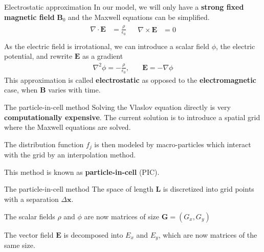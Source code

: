 \documentclass{beamer}
\newcommand*\V[1]{\bm{#1}}
\newcommand{\E}{\V{E}}
\newcommand{\B}{\V{B}}
\newcommand{\x}{\V{x}}
\begin{document}
\begin{frame}{Electrostatic approximation}{}
In our model, we will only have a \textbf{strong fixed magnetic field} $\B_0$ 
and the Maxwell equations can be simplified.
\small
\begin{align}
\begin{split}
\nabla \cdot \E &= \frac {\rho }{\epsilon_0} \\
\end{split}
&
\begin{split}
\nabla \times \E &= 0 \\
\end{split}
\end{align}
\normalsize
\pause
As the electric field is irrotational, we can introduce a scalar field $\phi$, 
the electric potential, and rewrite $\E$ as a gradient
\begin{align}
\nabla^2 \phi = - \frac{\rho}{\epsilon_0},
&
\quad
\E = - \nabla \phi
\end{align}
This approximation is called \textbf{electrostatic} as opposed to the 
\textbf{electromagnetic} case, when $\B$ varies with time.
\end{frame}


\begin{frame}{The particle-in-cell method}{}
Solving the Vlaslov equation directly is very \textbf{computationally 
expensive}. The current solution is to introduce a spatial grid where the 
Maxwell equations are solved.

\vspace{1em}
The distribution function $f_j$ is then modeled by macro-particles which 
interact with the grid by an interpolation method.

\vspace{1em}
This method is known as \textbf{particle-in-cell} (PIC).
\end{frame}

\begin{frame}{The particle-in-cell method}{}
The space of length $\V L$ is discretized into grid points with a separation 
$\Delta \x$.

\vspace{1em}
The scalar fields $\rho$ and $\phi$ are now matrices of size $\V G = (G_x, G_y)$

\vspace{1em}
The vector field $\E$ is decomposed into $E_x$ and $E_y$, which are now matrices 
of the same size.

\end{frame}
\end{document}
